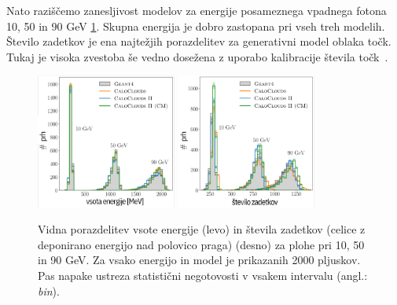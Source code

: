 \documentclass[12pt, a4paper]{article}
\begin{document}

Nato raziščemo zanesljivost modelov za energije posameznega vpadnega fotona 10, 50 in 90 GeV \ref{fig:Esum_Occ}. Skupna energija je dobro zastopana pri vseh treh modelih. Število zadetkov je ena najtežjih porazdelitev za generativni model oblaka točk. Tukaj je visoka zvestoba še vedno dosežena z uporabo kalibracije števila točk~\cite{CaloClouds2}.

\begin{figure}[htb!]
    \centering
   \includegraphics[width=0.41\textwidth]{Images_SLO/e_sum_singleE _SLO.pdf.png}
    \includegraphics[width=0.41\textwidth]{Images_SLO/occ_singleE _SLO.pdf.png}
    \caption{
    Vidna porazdelitev vsote energije (levo) in števila zadetkov (celice z deponirano energijo nad polovico praga) (desno) za plohe pri 10, 50 in 90 GeV. Za vsako energijo in model je prikazanih 2000 pljuskov. Pas napake ustreza statistični negotovosti v vsakem intervalu (angl.: \textit{bin}).
    }
    \label{fig:Esum_Occ}
    \hspace{0.5cm}
\end{figure}
\end{document}
